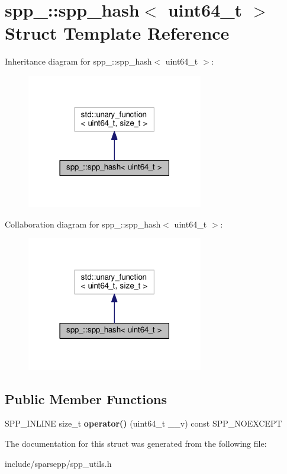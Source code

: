 \hypertarget{structspp___1_1spp__hash_3_01uint64__t_01_4}{}\section{spp\+\_\+\+:\+:spp\+\_\+hash$<$ uint64\+\_\+t $>$ Struct Template Reference}
\label{structspp___1_1spp__hash_3_01uint64__t_01_4}


Inheritance diagram for spp\+\_\+\+:\+:spp\+\_\+hash$<$ uint64\+\_\+t $>$\+:\nopagebreak
\begin{figure}[H]
\begin{center}
\leavevmode
\includegraphics[width=218pt]{structspp___1_1spp__hash_3_01uint64__t_01_4__inherit__graph}
\end{center}
\end{figure}


Collaboration diagram for spp\+\_\+\+:\+:spp\+\_\+hash$<$ uint64\+\_\+t $>$\+:\nopagebreak
\begin{figure}[H]
\begin{center}
\leavevmode
\includegraphics[width=218pt]{structspp___1_1spp__hash_3_01uint64__t_01_4__coll__graph}
\end{center}
\end{figure}
\subsection*{Public Member Functions}
\begin{DoxyCompactItemize}
\item 
S\+P\+P\+\_\+\+I\+N\+L\+I\+NE size\+\_\+t {\bfseries operator()} (uint64\+\_\+t \+\_\+\+\_\+v) const S\+P\+P\+\_\+\+N\+O\+E\+X\+C\+E\+PT\hypertarget{structspp___1_1spp__hash_3_01uint64__t_01_4_ac0b594094006ed33e752133f9b3ff755}{}\label{structspp___1_1spp__hash_3_01uint64__t_01_4_ac0b594094006ed33e752133f9b3ff755}

\end{DoxyCompactItemize}


The documentation for this struct was generated from the following file\+:\begin{DoxyCompactItemize}
\item 
include/sparsepp/spp\+\_\+utils.\+h\end{DoxyCompactItemize}
